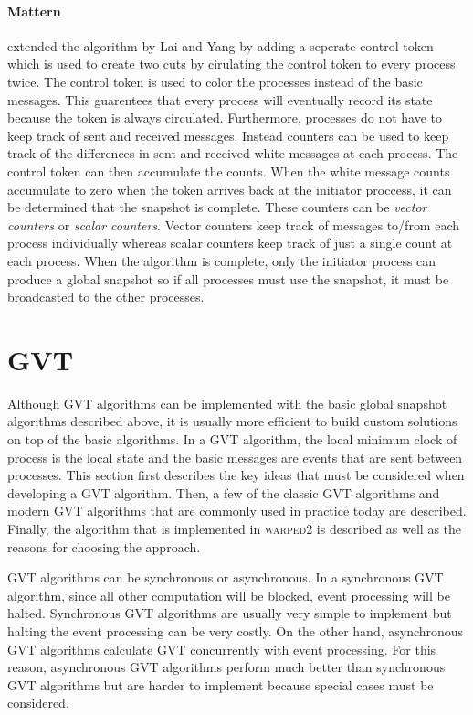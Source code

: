 \documentclass[11pt]{book}
\begin{document}
\paragraph{Mattern}\cite{mattern-93} extended the algorithm by Lai and Yang by adding a
seperate control token which is used to create two cuts by cirulating the control token to
every process twice.  The control token is used to color the processes instead of the basic
messages.  This guarentees that every process will eventually record its state because the
token is always circulated.  Furthermore, processes do not have to keep track of sent and
received messages.  Instead counters can be used to keep track of the differences in sent
and received white messages at each process.  The control token can then accumulate the
counts.  When the white message counts accumulate to zero when the token arrives back at
the initiator proccess, it can be determined that the snapshot is complete.  These counters
can be \emph{vector counters} or \emph{scalar counters}.  Vector counters keep track of
messages to/from each process individually whereas scalar counters keep track of just a
single count at each process.  When the algorithm is complete, only the initiator process
can produce a global snapshot so if all processes must use the snapshot, it must be broadcasted
to the other processes.

\section{GVT}

Although GVT algorithms can be implemented with the basic global snapshot algorithms described
above, it is usually more efficient to build custom solutions on top of the basic algorithms.
In a GVT algorithm, the local minimum clock of process is the local state and the basic
messages are events that are sent between processes.  This section first describes the key
ideas that must be considered when developing a GVT algorithm.  Then, a few of the classic
GVT algorithms and modern GVT algorithms that are commonly used in practice today are described.
Finally, the algorithm that is implemented in \textsc{warped2} is described as well as the
reasons for choosing the approach.

GVT algorithms can be synchronous or asynchronous.  In a synchronous GVT algorithm, since
all other computation will be blocked, event processing will be halted.  Synchronous GVT
algorithms are usually very simple to implement but halting the event processing can
be very costly.  On the other hand, asynchronous GVT algorithms calculate GVT concurrently
with event processing.  For this reason, asynchronous GVT algorithms perform much better
than synchronous GVT algorithms but are harder to implement because special cases must be
considered.
\end{document}
